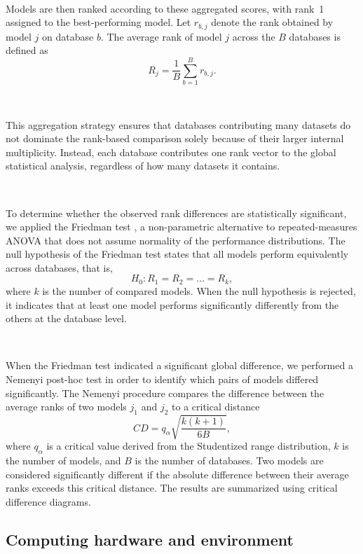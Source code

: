 \documentclass{article}
\begin{document}
~

Models are then ranked according to these aggregated scores, with rank~1 assigned to the best-performing model. Let $r_{b,j}$ denote the rank obtained by model $j$ on database $b$. The average rank of model $j$ across the $B$ databases is defined as
\[
R_j = \frac{1}{B}\sum_{b=1}^{B} r_{b,j}.
\]

~

This aggregation strategy ensures that databases contributing many datasets do not dominate the rank-based comparison solely because of their larger internal multiplicity. Instead, each database contributes one rank vector to the global statistical analysis, regardless of how many datasets it contains.

~

To determine whether the observed rank differences are statistically significant, we applied the Friedman test \cite{Friedman_test}, a non-parametric alternative to repeated-measures ANOVA that does not assume normality of the performance distributions. The null hypothesis of the Friedman test states that all models perform equivalently across databases, that is,
\[
H_0 : R_1 = R_2 = \dots = R_k,
\]
where $k$ is the number of compared models. When the null hypothesis is rejected, it indicates that at least one model performs significantly differently from the others at the database level.

~

When the Friedman test indicated a significant global difference, we performed a Nemenyi post-hoc test \cite{nemenyi_posthoc_test} in order to identify which pairs of models differed significantly. The Nemenyi procedure compares the difference between the average ranks of two models $j_1$ and $j_2$ to a critical distance
\[
CD = q_{\alpha} \sqrt{\frac{k(k+1)}{6B}},
\]
where $q_{\alpha}$ is a critical value derived from the Studentized range distribution, $k$ is the number of models, and $B$ is the number of databases. Two models are considered significantly different if the absolute difference between their average ranks exceeds this critical distance. The results are summarized using critical difference diagrams.





\subsection{Computing hardware and environment} \label{sec:hardware}
\end{document}
